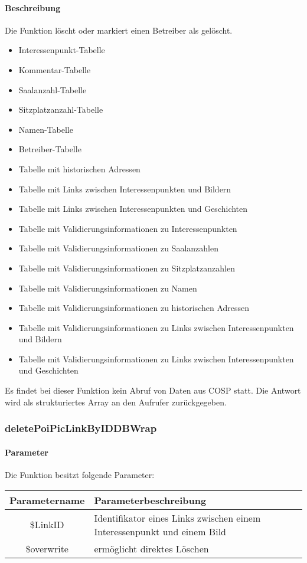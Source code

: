 \paragraph{Beschreibung} Die Funktion löscht oder markiert einen Betreiber als gelöscht.
\begin{itemize}
	\item Interessenpunkt-Tabelle
	\item Kommentar-Tabelle
	\item Saalanzahl-Tabelle
	\item Sitzplatzanzahl-Tabelle
	\item Namen-Tabelle
	\item Betreiber-Tabelle
	\item Tabelle mit historischen Adressen
	\item Tabelle mit Links zwischen Interessenpunkten und Bildern
	\item Tabelle mit Links zwischen Interessenpunkten und Geschichten
	\item Tabelle mit Validierungsinformationen zu Interessenpunkten
	\item Tabelle mit Validierungsinformationen zu Saalanzahlen
	\item Tabelle mit Validierungsinformationen zu Sitzplatzanzahlen
	\item Tabelle mit Validierungsinformationen zu Namen
	\item Tabelle mit Validierungsinformationen zu historischen Adressen
	\item Tabelle mit Validierungsinformationen zu Links zwischen Interessenpunkten und Bildern
	\item Tabelle mit Validierungsinformationen zu Links zwischen Interessenpunkten und Geschichten
\end{itemize}
Es findet bei dieser Funktion kein Abruf von Daten aus {\glqq COSP\grqq} statt. Die Antwort wird als strukturiertes Array an den Aufrufer zurückgegeben.
\subsubsection{deletePoiPicLinkByIDDBWrap}
\paragraph{Parameter} Die Funktion besitzt folgende Parameter:
\begin{table}[H]
	\begin{tabular}{|c|p{11cm}|}
		\hline
		\textbf{Parametername} & \textbf{Parameterbeschreibung} \\ \hline
		\$LinkID    & Identifikator eines Links zwischen einem Interessenpunkt und einem Bild \\ \hline
		\$overwrite & ermöglicht direktes Löschen \\ \hline
	\end{tabular}
\end{table}
